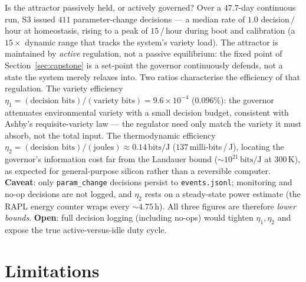 \documentclass[11pt, a4paper]{article}
\begin{document}
\begin{description}[itemsep=0.55em]
  \item[Q8 -- Governance tempo and efficiency \textnormal{(EXP-M4 / EXP-ETA, 2026-07)}]
    Is the attractor passively held, or actively governed?
    Over a $47.7$-day continuous run, S3 issued $411$ parameter-change
    decisions --- a median rate of $1.0$ decision\,/\,hour at homeostasis,
    rising to a peak of $15$\,/\,hour during boot and calibration
    (a $15\times$ dynamic range that tracks the system's variety load).
    The attractor is maintained by \emph{active} regulation, not a passive
    equilibrium: the fixed point of Section~\ref{sec:capstone} is a set-point the
    governor continuously defends, not a state the system merely relaxes into.
    Two ratios characterise the efficiency of that regulation.
    The variety efficiency
    $\eta_1 = (\text{decision bits})/(\text{variety bits}) = 9.6\times10^{-4}$
    ($0.096\%$): the governor attenuates environmental variety with a small
    decision budget, consistent with Ashby's requisite-variety law --- the
    regulator need only match the variety it must absorb, not the total input.
    The thermodynamic efficiency
    $\eta_2 = (\text{decision bits})/(\text{joules}) \approx 0.14\,\text{bits}/\text{J}$
    ($137$\,milli-bits\,/\,J), locating the governor's information cost far from the
    Landauer bound (${\sim}10^{21}\,\text{bits}/\text{J}$ at $300$\,K), as expected
    for general-purpose silicon rather than a reversible computer.
    \textbf{Caveat}: only \texttt{param\_change} decisions persist to
    \texttt{events.jsonl}; monitoring and no-op decisions are not logged, and
    $\eta_2$ rests on a steady-state power estimate (the RAPL energy counter wraps
    every ${\sim}4.75$\,h). All three figures are therefore \emph{lower bounds}.
    \textbf{Open}: full decision logging (including no-ops) would tighten
    $\eta_1,\eta_2$ and expose the true active-versus-idle duty cycle.

\end{description}


\section{Limitations}
\label{sec:limitations}
\end{document}
